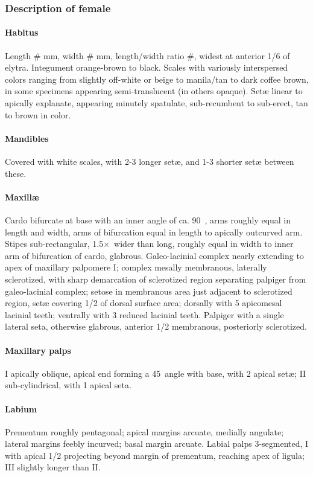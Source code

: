 \documentclass[fleqn,10pt,lineno]{wlpeerj} %
\newcommand{\td}{\textdegree~}
\newcommand{\x}{$\times$~}
\begin{document}
		\subsubsection*{Description of female}
			\paragraph{Habitus}
				Length \# mm, width \# mm, length/width ratio \#, widest at anterior 1/6 of elytra.
				Integument orange-brown to black.
				Scales with variously interspersed colors ranging from slightly off-white or beige to manila/tan to dark coffee brown, in some specimens appearing semi-translucent (in others opaque).
				Set{\ae} linear to apically explanate, appearing minutely spatulate, sub-recumbent to sub-erect, tan to brown in color.
			\paragraph{Mandibles}
				Covered with white scales, with 2-3 longer set{\ae}, and 1-3 shorter set{\ae} between these.
			\paragraph{Maxill{\ae}}
				Cardo bifurcate at base with an inner angle of ca. 90\td, arms roughly equal in length and width, arms of bifurcation equal in length to apically outcurved arm. 
				Stipes sub-rectangular, 1.5\x wider than long, roughly equal in width to inner arm of bifurcation of cardo, glabrous. 
				Galeo-lacinial complex nearly extending to apex of maxillary palpomere I; complex mesally membranous, laterally sclerotized, with sharp demarcation of sclerotized region separating palpiger from galeo-lacinial complex; setose in membranous area just adjacent to sclerotized region, set{\ae} covering 1/2 of dorsal surface area; dorsally with 5 apicomesal lacinial teeth; ventrally with 3 reduced lacinial teeth. 
				Palpiger with a single lateral seta, otherwise glabrous, anterior 1/2 membranous, posteriorly sclerotized.
			\paragraph{Maxillary palps}
				I apically oblique, apical end forming a 45\td angle with base, with 2 apical set{\ae}; II sub-cylindrical, with 1 apical seta.
			\paragraph{Labium}
				Prementum roughly pentagonal; apical margins arcuate, medially angulate; lateral margins feebly incurved; basal margin arcuate. 
				Labial palps 3-segmented, I with apical 1/2 projecting beyond margin of prementum, reaching apex of ligula; III slightly
longer than II.
\end{document}
